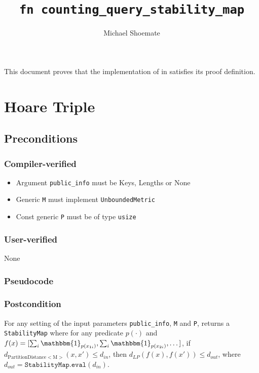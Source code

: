 \documentclass{article}
\title{\texttt{fn counting\_query\_stability\_map}}
\author{Michael Shoemate}
\begin{document}
\maketitle

This document proves that the implementation of  in  
satisfies its proof definition.

\section{Hoare Triple}
\subsection*{Preconditions}
\subsubsection*{Compiler-verified}
\begin{itemize}
    \item Argument \texttt{public\_info} must be Keys, Lengths or None
    \item Generic \texttt{M} must implement \texttt{UnboundedMetric}
    \item Const generic \texttt{P} must be of type \texttt{usize}
\end{itemize}

\subsubsection*{User-verified}
None

\subsubsection*{Pseudocode}



\subsubsection*{Postcondition}
\begin{definition}
    \label{sample-bernoulli}
    For any setting of the input parameters \texttt{public\_info}, \texttt{M} and \texttt{P}, 
    returns a \texttt{StabilityMap} where for any predicate $p(\cdot)$ 
    and $f(x) = [\sum_i \mathbbm{1}_{p(x_{1i})}, \sum_i \mathbbm{1}_{p(x_{2i})}, \dots]$, 
    if $d_{\mathrm{PartitionDistance<M>}}(x, x') \leq d_{in}$,
    then $d_{LP}(f(x), f(x')) \leq d_{out}$, where $d_{out} = \texttt{StabilityMap.eval}(d_{in})$.
\end{definition}
\end{document}

